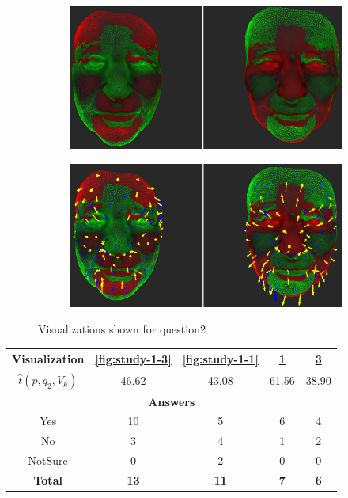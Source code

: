 \begin{figure}[h]
\begin{subfigure}{0.4\textwidth}
\includegraphics[width=\textwidth]{./screenshots/pair2.PNG}
\caption{}
\label{fig:study-1-2}
\end{subfigure}
\quad
\begin{subfigure}{0.4\textwidth}
\includegraphics[width=\textwidth]{./screenshots/pair4.PNG}
\caption{}
\label{fig:study-1-4}
\end{subfigure}
\caption{Visualizations shown for question2}
\end{figure}
\medskip

\begin{center}
\begin{tabular}{| c | c | c | c | c |}
	\hline
	Visualization & \ref{fig:study-1-3} & \ref{fig:study-1-1} & \ref{fig:study-1-2} & \ref{fig:study-1-4}\\ \hline
	\(\widehat{t}(p, q_2, V_k)\) & 46.62 & 43.08 & 61.56 & 38.90\\ \hline
	\multicolumn{5}{|c|}{\bf Answers} \\ \hline
	Yes & 10 & 5 & 6 & 4\\ \hline
	No & 3 & 4 & 1 & 2\\ \hline
	NotSure & 0 & 2 & 0 & 0\\ \hline
	{\bf Total} & {\bf 13} & {\bf 11} & {\bf 7} & {\bf 6}\\ \hline
\end{tabular}
\end{center}
\clearpage

